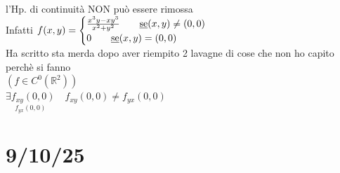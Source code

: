 \documentclass[a4paper, oneside]{article}
\begin{document}
        \begin{observation}
            l'Hp. di continuità NON può essere rimossa\\
            Infatti $f(x,y) = \begin{cases}
                \frac{x^3y-xy^3}{x^2+y^2} \qquad \text{\underbar{se}} (x,y) \neq (0,0)\\
                0 \qquad \text{\underbar{se}} (x,y) = (0,0)\\
            \end{cases}$\\
            Ha scritto sta merda dopo aver riempito 2 lavagne di cose che non ho capito perchè si fanno\\
            $(f \in C^0(\mathbb{R}^2))$\\
            $\underset{f_{yx} (0,0)}{\exists f_{xy} (0,0)} \quad f_{xy} (0,0) \neq f_{yx}(0,0)$
        \end{observation}
        \newpage
        \section{9/10/25}
\end{document}
